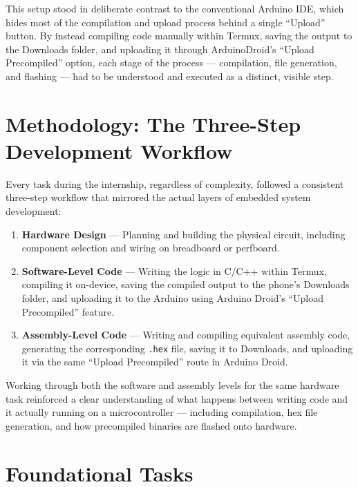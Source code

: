 \documentclass[12pt,a4paper]{report}
\begin{document}
This setup stood in deliberate contrast to the conventional Arduino IDE, which hides most of the compilation and upload process behind a single ``Upload'' button. By instead compiling code manually within Termux, saving the output to the Downloads folder, and uploading it through ArduinoDroid's ``Upload Precompiled'' option, each stage of the process --- compilation, file generation, and flashing --- had to be understood and executed as a distinct, visible step.

\chapter{Methodology: The Three-Step Development Workflow}
\label{ch:methodology}

Every task during the internship, regardless of complexity, followed a consistent three-step workflow that mirrored the actual layers of embedded system development:

\begin{enumerate}
    \item \textbf{Hardware Design} --- Planning and building the physical circuit, including component selection and wiring on breadboard or perfboard.
    \item \textbf{Software-Level Code} --- Writing the logic in C/C++ within Termux, compiling it on-device, saving the compiled output to the phone's Downloads folder, and uploading it to the Arduino using Arduino Droid's ``Upload Precompiled'' feature.
    \item \textbf{Assembly-Level Code} --- Writing and compiling equivalent assembly code, generating the corresponding \texttt{.hex} file, saving it to Downloads, and uploading it via the same ``Upload Precompiled'' route in Arduino Droid.
\end{enumerate}

Working through both the software and assembly levels for the same hardware task reinforced a clear understanding of what happens between writing code and it actually running on a microcontroller --- including compilation, hex file generation, and how precompiled binaries are flashed onto hardware.

\chapter{Foundational Tasks}
\label{ch:foundational}
\end{document}
